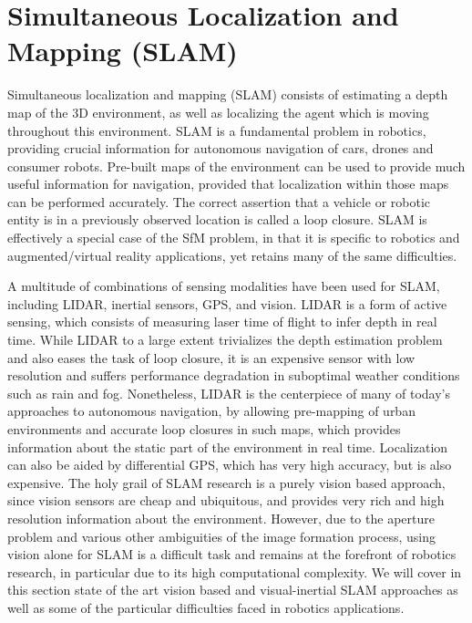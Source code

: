 \documentclass[10pt]{article}
\begin{document}
\section{Simultaneous Localization and Mapping (SLAM)}
\label{sec:SLAM}
Simultaneous localization and mapping (SLAM) consists of estimating a depth map of the $3$D environment, as well as localizing the agent which is moving throughout this environment. SLAM is a fundamental problem in robotics, providing crucial information for autonomous navigation of cars, drones and consumer robots. Pre-built maps of the environment can be used to provide much useful information for navigation, provided that localization within those maps can be performed accurately. The correct assertion that a vehicle or robotic entity is in a previously observed location is called a loop closure. SLAM is effectively a special case of the SfM problem, in that it is specific to robotics and augmented/virtual reality applications, yet retains many of the same difficulties. 

A multitude of combinations of sensing modalities have been used for SLAM, including LIDAR, inertial sensors, GPS, and vision. LIDAR is a form of active sensing, which consists of measuring laser time of flight to infer depth in real time. While LIDAR to a large extent trivializes the depth estimation problem and also eases the task of loop closure, it is an expensive sensor with low resolution and suffers performance degradation in suboptimal weather conditions such as rain and fog. Nonetheless, LIDAR is the centerpiece of many of today's approaches to autonomous navigation, by allowing pre-mapping of urban environments and accurate loop closures in such maps, which provides information about the static part of the environment in real time. Localization can also be aided by differential GPS, which has very high accuracy, but is also expensive. The holy grail of SLAM research is a purely vision based approach, since vision sensors are cheap and ubiquitous, and provides very rich and high resolution information about the environment. However, due to the aperture problem and various other ambiguities of the image formation process, using vision alone for SLAM is a difficult task and remains at the forefront of robotics research, in particular due to its high computational complexity. We will cover in this section state of the art vision based and visual-inertial SLAM approaches as well as some of the particular difficulties faced in robotics applications. 
\end{document}
